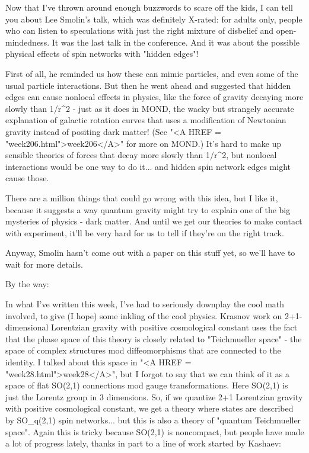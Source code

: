 Now that I've thrown around enough buzzwords to scare off the kids, 
I can tell you about Lee Smolin's talk, which was definitely X-rated:
for adults only, people who can listen to speculations with just the
right mixture of disbelief and open-mindedness.  It was the last talk
in the conference.  And it was about the possible physical effects of
spin networks with "hidden edges"!  

First of all, he reminded us how these can mimic particles, and
even some of the usual particle interactions.  But then he went 
ahead and suggested that hidden edges can cause nonlocal effects in
physics, like the force of gravity decaying more slowly than 1/r^{2} - 
just as it does in MOND, the wacky but strangely accurate explanation 
of galactic rotation curves that uses a modification of Newtonian 
gravity instead of positing dark matter!  (See "<A HREF = "week206.html">week206</A>" for more on 
MOND.)  It's hard to make up sensible theories of forces that decay 
more slowly than 1/r^{2}, 
but nonlocal interactions would be one way to 
do it... and hidden spin network edges might cause those.  

There are a million things that could go wrong with this idea, but
I like it, because it suggests a way quantum gravity might try to 
explain one of the big mysteries of physics - dark matter.  And until
we get our theories to make contact with experiment, it'll be very hard
for us to tell if they're on the right track.

Anyway, Smolin hasn't come out with a paper on this stuff yet, so we'll
have to wait for more details.

By the way:

In what I've written this week, I've had to seriously downplay the 
cool math involved, to give (I hope) some inkling of the cool physics.
Krasnov work on 2+1-dimensional Lorentzian gravity with positive
cosmological constant uses the fact that the phase space of this
theory is closely related to "Teichmueller space" - the space of 
complex structures mod diffeomorphisms that are connected to the 
identity.  I talked about this space in "<A HREF = "week28.html">week28</A>", but I forgot to say 
that we can think of it as a space of flat SO(2,1) connections mod 
gauge transformations.  Here SO(2,1) is just the Lorentz group in 3
dimensions.  So, if we quantize 2+1 Lorentzian gravity with positive 
cosmological constant, we get a theory where states are described by 
SO_{q}(2,1) spin networks... but this is also a theory of "quantum 
Teichmueller space".  Again this is tricky because SO(2,1) is noncompact, 
but people have made a lot of progress lately, thanks in part to a line 
of work started by Kashaev:

